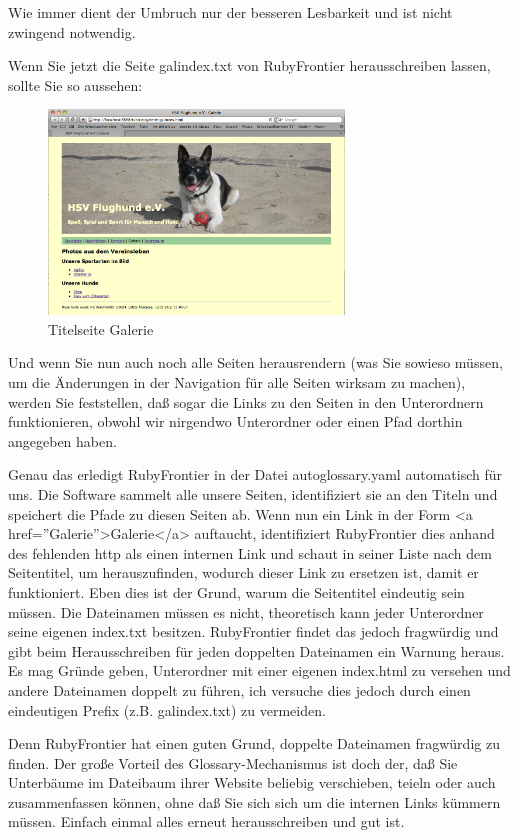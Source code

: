 \documentclass[11pt]{report}
\begin{document}
Wie immer dient der Umbruch nur der besseren Lesbarkeit und ist nicht
zwingend notwendig.


Wenn Sie jetzt die Seite galindex.txt von RubyFrontier herausschreiben
lassen, sollte Sie so aussehen:

\begin{figure}[h!]
\centering
\includegraphics[width=0.7\textwidth]{./images/galerie02.png}
\caption{\label{galerie02}Titelseite Galerie}
\end{figure}

Und wenn Sie nun auch noch alle Seiten herausrendern (was Sie sowieso
müssen, um die Änderungen in der Navigation für alle Seiten wirksam zu
machen), werden Sie feststellen, daß sogar die Links zu den Seiten in
den Unterordnern funktionieren, obwohl wir nirgendwo Unterordner oder
einen Pfad dorthin angegeben haben.


Genau das erledigt RubyFrontier in der Datei autoglossary.yaml
automatisch für uns. Die Software sammelt alle unsere Seiten,
identifiziert sie an den Titeln und speichert die Pfade zu diesen
Seiten ab. Wenn nun ein Link in der Form <a href=''Galerie''>Galerie</a>
auftaucht, identifiziert RubyFrontier dies anhand des fehlenden http
als einen internen Link und schaut in seiner Liste nach dem
Seitentitel, um herauszufinden, wodurch dieser Link zu ersetzen ist,
damit er funktioniert. Eben dies ist der Grund, warum die Seitentitel
eindeutig sein müssen. Die Dateinamen müssen es nicht, theoretisch
kann jeder Unterordner seine eigenen index.txt besitzen. RubyFrontier
findet das jedoch fragwürdig und gibt beim Herausschreiben für jeden
doppelten Dateinamen ein Warnung heraus. Es mag Gründe geben,
Unterordner mit einer eigenen index.html zu versehen und andere
Dateinamen doppelt zu führen, ich versuche dies jedoch durch einen
eindeutigen Prefix (z.B. galindex.txt) zu vermeiden.


Denn RubyFrontier hat einen guten Grund, doppelte Dateinamen
fragwürdig zu finden. Der große Vorteil des Glossary-Mechanismus ist
doch der, daß Sie Unterbäume im Dateibaum ihrer Website beliebig
verschieben, teieln oder auch zusammenfassen können, ohne daß Sie sich
sich um die internen Links kümmern müssen. Einfach einmal alles erneut
herausschreiben und gut ist.
\end{document}
